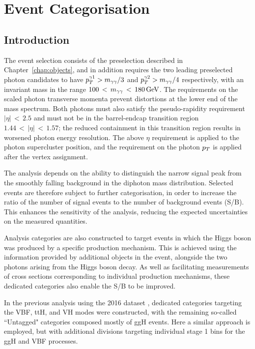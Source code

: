 \chapter{Event Categorisation}
\label{chap:categorisation}

\section{Introduction}

The event selection consists of the preselection described in Chapter~\ref{chap:objects}, 
and in addition requires the two leading preselected photon candidates to have 
$p_T^{\gamma 1} > m_{\gamma\gamma}/3$ and $p_T^{\gamma 2} > m_{\gamma\gamma} /4$ respectively, 
with an invariant mass in the range $100\,<\,m_{\gamma\gamma}\,<\,\SI{180}{GeV}$.
The requirements on the scaled photon transverse momenta prevent distortions 
at the lower end of the mass spectrum.
Both photons must also satisfy the
pseudo-rapidity requirement $|\eta|\,<\,2.5$ and must not be in the barrel-endcap
transition region $1.44\,<\,|\eta|\,<\,1.57$;
the reduced containment in this transition region results in worsened photon energy resolution.
The above $\eta$ requirement is applied to the photon supercluster
position, and the requirement on the photon $p_T$ is applied 
after the vertex assignment.

The \Hgg analysis depends on the ability to distinguish the narrow signal peak 
from the smoothly falling background in the diphoton mass distribution.
Selected events are therefore subject to further categorisation, in order to 
increase the ratio of the number of signal events to the number of background events (S/B).
This enhances the sensitivity of the analysis, 
reducing the expected uncertainties on the measured quantities.

Analysis categories are also constructed to target events in which the Higgs boson was 
produced by a specific production mechanism. 
This is achieved using the information provided by additional objects in the event, 
alongside the two photons arising from the Higgs boson decay.
As well as facilitating measurements of cross sections corresponding 
to individual production mechanisms, these dedicated categories also enable the S/B to be improved.

In the previous \Hgg analysis using the 2016 dataset \cite{HIG-16-040}, 
dedicated categories targeting the VBF, ttH, and VH modes were constructed, 
with the remaining so-called ``Untagged" categories composed mostly of ggH events.
Here a similar approach is employed, 
but with additional divisions targeting individual stage 1 bins for the ggH and VBF processes.

